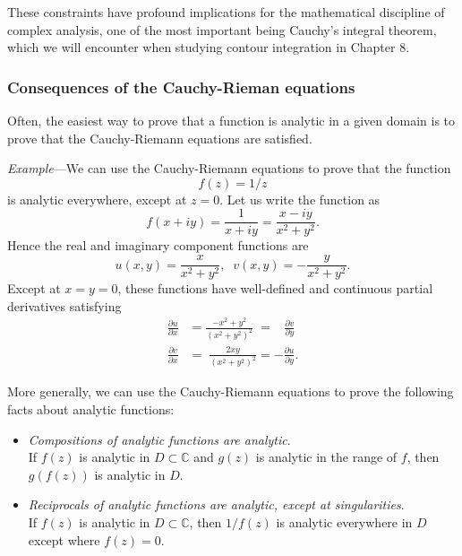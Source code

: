 \documentclass[10pt,a4paper]{article}
\begin{document}
\noindent
These constraints have profound implications for the mathematical
discipline of complex analysis, one of the most important being
Cauchy's integral theorem, which we will encounter when studying
contour integration in Chapter 8.

\subsubsection{Consequences of the Cauchy-Rieman equations}
\label{consequences-of-the-cauchy-riemann-equations}

Often, the easiest way to prove that a function is analytic in a given
domain is to prove that the Cauchy-Riemann equations are satisfied.

\begin{framed}\noindent
  \textit{Example}---We can use the Cauchy-Riemann equations to prove
  that the function
  \begin{equation}
    f(z)=1/z
  \end{equation}
  is analytic everywhere, except at $z = 0$. Let us write the function
  as
  \begin{equation}
    f(x+iy) = \frac{1}{x+iy} = \frac{x-iy}{x^2+y^2}.
  \end{equation}
  Hence the real and imaginary component functions are
  \begin{equation}
    u(x,y) = \frac{x}{x^2+y^2}, \;\;v(x,y) = - \frac{y}{x^2+y^2}.
  \end{equation}
  Except at $x = y = 0$, these functions have well-defined
  and continuous partial derivatives satisfying
  \begin{align}
    \frac{\partial u}{\partial x} &= \frac{-x^2+y^2}{(x^2+y^2)^2}
    \;= \;\;\;\frac{\partial v}{\partial y} \\
    \frac{\partial v}{\partial x} &= \; \frac{2xy}{(x^2+y^2)^2}
    = -\frac{\partial u}{\partial y}.
  \end{align}
\end{framed}

More generally, we can use the Cauchy-Riemann equations to prove the
following facts about analytic functions:

\begin{itemize}
\item
  \emph{Compositions of analytic functions are analytic}.
  \\ If $f(z)$ is analytic in $D \subset \mathbb{C}$ and $g(z)$ is
    analytic in the range of $f$, then $g(f(z))$ is analytic in $D$.

\item
  \emph{Reciprocals of analytic functions are analytic, except at
  singularities}. \\ If $f(z)$ is analytic in $D \subset \mathbb{C}$,
  then $1/f(z)$ is analytic everywhere in $D$ except where
  $f(z) = 0$.
\end{itemize}
\end{document}
